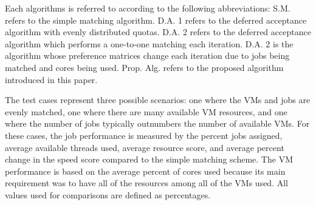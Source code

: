 \documentclass[conference]{IEEEtran}
\begin{document}
Each algorithms is referred to according to the following
abbreviations:  S.M. refers to the simple matching algorithm. 
D.A. 1 refers to the deferred acceptance algorithm with evenly distributed quotas. 
D.A. 2 refers to the deferred acceptance algorithm which performs a one-to-one 
matching each iteration.  D.A. 2 is the algorithm whose preference matrices change
each iteration due to jobs being matched and cores being used.  
Prop. Alg. refers to the proposed algorithm introduced in this paper.

The test cases represent three possible scenarios:  one where the VMs and 
jobs are evenly matched, one where there are many available VM resources, 
and one where the number of jobs typically outnumbers the number of 
available VMs.  For these cases, the job performance is measured by the percent jobs 
assigned, average available threads used, average resource score, and average 
percent change in the speed score compared to the simple matching scheme.  The 
VM performance is based on the average percent of cores used because its main 
requirement was to have all of the resources among all of the VMs used.  All values 
used for comparisons are defined as percentages.
\end{document}

